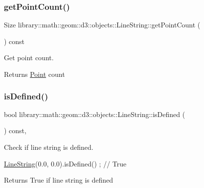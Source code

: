 \subsubsection{\texorpdfstring{get\+Point\+Count()}{getPointCount()}}
{\footnotesize\ttfamily Size library\+::math\+::geom\+::d3\+::objects\+::\+Line\+String\+::get\+Point\+Count (\begin{DoxyParamCaption}{ }\end{DoxyParamCaption}) const}



Get point count. 

\begin{DoxyReturn}{Returns}
\hyperlink{classlibrary_1_1math_1_1geom_1_1d3_1_1objects_1_1_point}{Point} count 
\end{DoxyReturn}
\mbox{\label{classlibrary_1_1math_1_1geom_1_1d3_1_1objects_1_1_line_string_a310ff5c1068792e92b58bcda8e72dfec}} 
\subsubsection{\texorpdfstring{is\+Defined()}{isDefined()}}
{\footnotesize\ttfamily bool library\+::math\+::geom\+::d3\+::objects\+::\+Line\+String\+::is\+Defined (\begin{DoxyParamCaption}{ }\end{DoxyParamCaption}) const\hspace{0.3cm}{\ttfamily [override]}, {\ttfamily [virtual]}}



Check if line string is defined. 


\begin{DoxyCode}
\hyperlink{classlibrary_1_1math_1_1geom_1_1d3_1_1objects_1_1_line_string_aab80e60f34f06d4ab9f84f0e59aa389e}{LineString}(0.0, 0.0).isDefined() ; \textcolor{comment}{// True}
\end{DoxyCode}


\begin{DoxyReturn}{Returns}
True if line string is defined 
\end{DoxyReturn}



